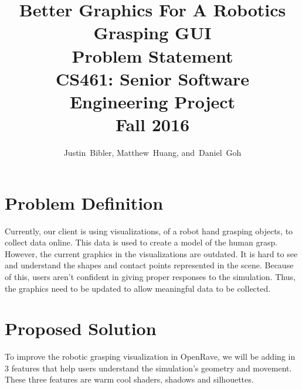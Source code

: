 \documentclass[10pt,journal,compsoc]{IEEEtran}
\begin{document}
\onecolumn
\begin{titlepage}
\title{Better Graphics For A Robotics Grasping GUI\\ Problem Statement \\  [0.5em] 
	\large CS461: Senior Software Engineering Project \\ Fall 2016}

\author{Justin~Bibler,
        Matthew~Huang,
        and~Daniel~Goh}
		

\maketitle

\end{titlepage}

\section{Problem Definition}
Currently, our client is using visualizations, of a robot hand grasping objects, to collect data online.
This data is used to create a model of the human grasp.
However, the current graphics in the visualizations are outdated.
It is hard to see and understand the shapes and contact points represented in the scene.
Because of this, users aren't confident in giving proper responses to the simulation.
Thus, the graphics need to be updated to allow meaningful data to be collected.

\section{Proposed Solution}
To improve the robotic grasping visualization in OpenRave, we will be adding in 3 features that help users understand the simulation's geometry and movement. 
These three features are warm cool shaders, shadows and silhouettes. \par
\end{document}
